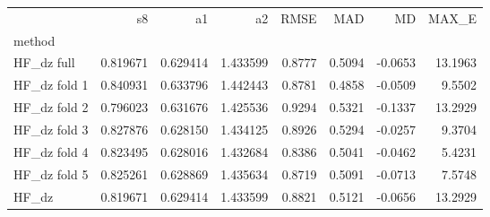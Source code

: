 \begin{tabular}{lrrrrrrr}
 & s8 & a1 & a2 & RMSE & MAD & MD & MAX_E \\
method &  &  &  &  &  &  &  \\
HF_dz full & 0.819671 & 0.629414 & 1.433599 & 0.8777 & 0.5094 & -0.0653 & 13.1963 \\
HF_dz fold 1 & 0.840931 & 0.633796 & 1.442443 & 0.8781 & 0.4858 & -0.0509 & 9.5502 \\
HF_dz fold 2 & 0.796023 & 0.631676 & 1.425536 & 0.9294 & 0.5321 & -0.1337 & 13.2929 \\
HF_dz fold 3 & 0.827876 & 0.628150 & 1.434125 & 0.8926 & 0.5294 & -0.0257 & 9.3704 \\
HF_dz fold 4 & 0.823495 & 0.628016 & 1.432684 & 0.8386 & 0.5041 & -0.0462 & 5.4231 \\
HF_dz fold 5 & 0.825261 & 0.628869 & 1.435634 & 0.8719 & 0.5091 & -0.0713 & 7.5748 \\
HF_dz & 0.819671 & 0.629414 & 1.433599 & 0.8821 & 0.5121 & -0.0656 & 13.2929 \\
\end{tabular}
